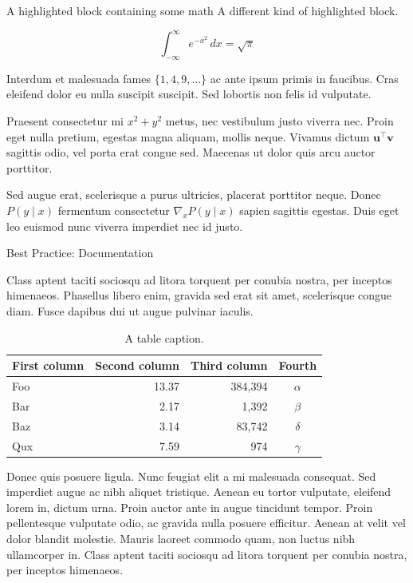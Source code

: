 \documentclass[final]{beamer}
\newlength{\colwidth}
\begin{document}
\begin{frame}[t]
\begin{columns}[t]
\begin{column}{\colwidth}
\begin{exampleblock}{A highlighted block containing some math}
    A different kind of highlighted block.

    $$
    \int_{-\infty}^{\infty} e^{-x^2}\,dx = \sqrt{\pi}
    $$

    Interdum et malesuada fames $\{1, 4, 9, \ldots\}$ ac ante ipsum primis in
    faucibus. Cras eleifend dolor eu nulla suscipit suscipit. Sed lobortis non
    felis id vulputate.


    Praesent consectetur mi $x^2 + y^2$ metus, nec vestibulum justo viverra
    nec. Proin eget nulla pretium, egestas magna aliquam, mollis neque. Vivamus
    dictum $\mathbf{u}^\intercal\mathbf{v}$ sagittis odio, vel porta erat
    congue sed. Maecenas ut dolor quis arcu auctor porttitor.


    Sed augue erat, scelerisque a purus ultricies, placerat porttitor neque.
    Donec $P(y \mid x)$ fermentum consectetur $\nabla_x P(y \mid x)$ sapien
    sagittis egestas. Duis eget leo euismod nunc viverra imperdiet nec id
    justo.

  \end{exampleblock}

  \begin{block}{Best Practice: Documentation}

    Class aptent taciti sociosqu ad litora torquent per conubia nostra, per
    inceptos himenaeos. Phasellus libero enim, gravida sed erat sit amet,
    scelerisque congue diam. Fusce dapibus dui ut augue pulvinar iaculis.

    \begin{table}
      \centering
      \begin{tabular}{l r r c}
        \toprule
        \textbf{First column} & \textbf{Second column} & \textbf{Third column} & \textbf{Fourth} \\
        \midrule
        Foo & 13.37 & 384,394 & $\alpha$ \\
        Bar & 2.17 & 1,392 & $\beta$ \\
        Baz & 3.14 & 83,742 & $\delta$ \\
        Qux & 7.59 & 974 & $\gamma$ \\
        \bottomrule
      \end{tabular}
      \caption{A table caption.}
    \end{table}

    Donec quis posuere ligula. Nunc feugiat elit a mi malesuada consequat. Sed
    imperdiet augue ac nibh aliquet tristique. Aenean eu tortor vulputate,
    eleifend lorem in, dictum urna. Proin auctor ante in augue tincidunt
    tempor. Proin pellentesque vulputate odio, ac gravida nulla posuere
    efficitur. Aenean at velit vel dolor blandit molestie. Mauris laoreet
    commodo quam, non luctus nibh ullamcorper in. Class aptent taciti sociosqu
    ad litora torquent per conubia nostra, per inceptos himenaeos.


\end{block}
\end{column}
\end{columns}
\end{frame}
\end{document}
